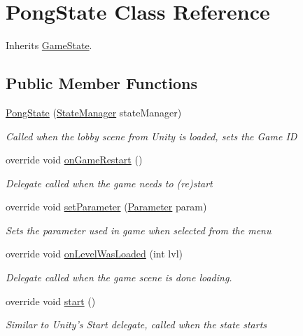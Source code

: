 \hypertarget{class_pong_state}{\section{Pong\-State Class Reference}
\label{class_pong_state}
}


Inherits \hyperlink{class_game_state}{Game\-State}.

\subsection*{Public Member Functions}
\begin{DoxyCompactItemize}
\item 
\hyperlink{class_pong_state_a2b2fda30fe67d062ff32527cbba18e6d}{Pong\-State} (\hyperlink{class_state_manager}{State\-Manager} state\-Manager)
\begin{DoxyCompactList}\small\item\em Called when the lobby scene from Unity is loaded, sets the Game I\-D \end{DoxyCompactList}\item 
override void \hyperlink{class_pong_state_a8c5095bec45db7cc14f884b86cdd67b4}{on\-Game\-Restart} ()
\begin{DoxyCompactList}\small\item\em Delegate called when the game needs to (re)start \end{DoxyCompactList}\item 
override void \hyperlink{class_pong_state_a09c1f355ea003160b60653795bac33ea}{set\-Parameter} (\hyperlink{class_parameter}{Parameter} param)
\begin{DoxyCompactList}\small\item\em Sets the parameter used in game when selected from the menu \end{DoxyCompactList}\item 
override void \hyperlink{class_pong_state_aa4d7e05bf27dc9f37118d2651ea8c10f}{on\-Level\-Was\-Loaded} (int lvl)
\begin{DoxyCompactList}\small\item\em Delegate called when the game scene is done loading. \end{DoxyCompactList}\item 
override void \hyperlink{class_pong_state_aac21df44a9352b2fe77ae3635a2374a7}{start} ()
\begin{DoxyCompactList}\small\item\em Similar to Unity's Start delegate, called when the state starts \end{DoxyCompactList}\item 

\end{DoxyCompactItemize}
